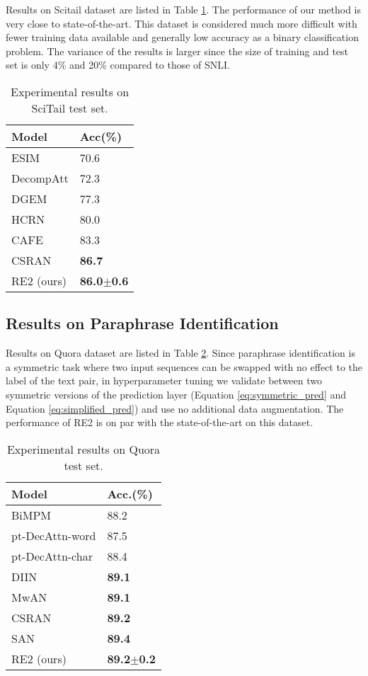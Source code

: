 \documentclass[11pt,a4paper]{article}
\begin{document}
Results on Scitail dataset are listed in Table \ref{tab:scitail-result}. The performance of our method is very close to state-of-the-art. This dataset is considered much more difficult with fewer training data available and generally low accuracy as a binary classification problem. The variance of the results is larger since the size of training and test set is only 4\% and 20\% compared to those of SNLI.

\begin{table}
  \centering
  \small
  \begin{tabular}{|l|l|}
  \hline
  {\bf Model} & {\bf Acc(\%)}\\\hline
  ESIM \cite{chen2017enhanced} & 70.6 \\  
  DecompAtt \cite{parikh2016decomposable} & 72.3 \\
  DGEM \cite{scitail} & 77.3 \\
  HCRN \cite{tay2018hermitian} & 80.0 \\
  CAFE \cite{tay2018compare} & 83.3 \\
  CSRAN \cite{tay2018co} & {\bf 86.7} \\\hline
  RE2 (ours) & {\bf 86.0$\pm$0.6} \\\hline
  \end{tabular}
  \caption{Experimental results on SciTail test set.}\label{tab:scitail-result}
\end{table}

\subsection{Results on Paraphrase Identification}
Results on Quora dataset are listed in Table \ref{tab:quora-result}. Since paraphrase identification is a symmetric task where two input sequences can be swapped with no effect to the label of the text pair, in hyperparameter tuning we validate between two symmetric versions of the prediction layer (Equation \ref{eq:symmetric_pred} and Equation \ref{eq:simplified_pred}) and use no additional data augmentation. The performance of RE2 is on par with the state-of-the-art on this dataset. 

\begin{table}
  \centering
  \small
  \begin{tabular}{|l|l|}
  \hline
  {\bf Model} & {\bf Acc.(\%)}\\\hline
    BiMPM \cite{wang2017bilateral} & 88.2 \\
    pt-DecAttn-word \cite{tomar2017neural} & 87.5\\
    pt-DecAttn-char \cite{tomar2017neural} & 88.4\\
    DIIN \cite{gong2018natural} & {\bf 89.1} \\ 
    MwAN \cite{tan2018multiway} & {\bf 89.1} \\
    CSRAN \cite{tay2018co} & {\bf 89.2} \\
    SAN \cite{liu2018stochastic} & {\bf 89.4} \\\hline
    RE2 (ours) & {\bf 89.2$\pm$0.2}
    \\\hline
  \end{tabular}
  \caption{Experimental results on Quora test set. }\label{tab:quora-result}
\end{table}
\end{document}

